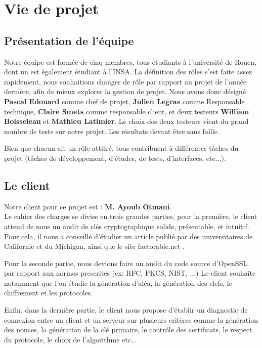 \chapter{Vie de projet}
\section{Présentation de l'équipe}

Notre équipe est formée de cinq membres, tous étudiants à l'université de Rouen, dont un est également étudiant à l'INSA.
La définition des rôles s'est faite assez rapidement, nous souhaitions changer de rôle par rapport au projet de l'année dernière, afin de mieux explorer la gestion de projet.
Nous avons donc désigné \textbf{Pascal Edouard} comme chef de projet, \textbf{Julien Legras} comme Responsable technique, \textbf{Claire Smets} comme responsable client, et deux testeurs \textbf{William Boisseleau} et \textbf{Mathieu Latimier}.
Le choix des deux testeurs vient du grand nombre de tests sur notre projet. Les résultats devant être sans faille.

Bien que chacun ait un rôle attitré, tous contribuent à différentes tâches du projet (tâches de développement, d'études, de tests, d'interfaces, etc...).

\section{Le client}

Notre client pour ce projet est : \textbf{M. Ayoub Otmani}. \\
Le cahier des charges se divise en trois grandes parties, pour la première, le client attend de nous un audit de clés cryptographique solide, présentable, et intuitif. Pour cela, il nous a conseillé d'étudier un article \cite{mining2012nadia} publié par des universitaires de Californie et du Michigan, ainsi que le site factorable.net \cite{factorable}.

Pour la seconde partie, nous devions faire un audit du code source d'OpenSSL par rapport aux normes prescrites (ex: RFC, PKCS, NIST, ...)
Le client souhaite notamment que l'on étudie la génération d'aléa, la génération des clefs, le chiffrement et les protocoles.

Enfin, dans la dernière partie, le client nous propose d'établir un diagnostic de connexion entre un client et un serveur sur plusieurs critères comme la génération des nonces, la génération de la clé primaire, le contrôle des certificats, le respect du protocole, le choix de l'algorithme etc...

